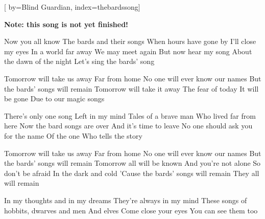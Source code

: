 
[%
    by={Blind Guardian},
    index={thebardssong}]


    \label{thebardssong}

    \textbf{Note: this song is not yet finished!}

    \beginverse
        Now you all know
        The bards and their songs
        When hours have gone by
        I'll close my eyes
        In a world far away
        We may meet again
        But now hear my song
        About the dawn of the night
        Let's sing the bards' song
    \endverse

    \beginchorus
        Tomorrow will take us away
        Far from home
        No one will ever know our names
        But the bards' songs will remain
        Tomorrow will take it away
        The fear of today
        It will be gone
        Due to our magic songs
    \endchorus

    \beginverse
        There's only one song
        Left in my mind
        Tales of a brave man
        Who lived far from here
        Now the bard songs are over
        And it's time to leave
        No one should ask you for the name
        Of the one
        Who tells the story
    \endverse

    \beginchorus
        Tomorrow will take us away
        Far from home
        No one will ever know our names
        But the bards' songs will remain
        Tomorrow all will be known
        And you're not alone
        So don't be afraid
        In the dark and cold
        'Cause the bards' songs will remain
        They all will remain
    \endchorus

    \beginverse*
        In my thoughts and in my dreams
        They're always in my mind
        These songs of hobbits, dwarves and men
        And elves
        Come close your eyes
        You can see them too
    \endverse
\endsong
